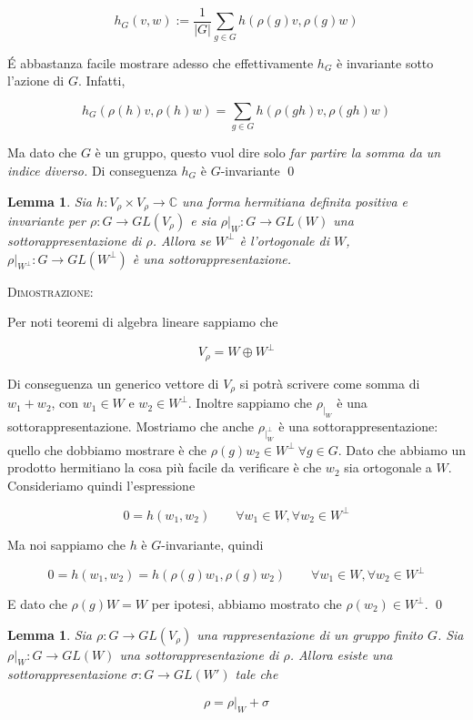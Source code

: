 \documentclass[11pt]{article}
\theoremstyle{plain}
\newtheorem{lemma}[thm]{Lemma}
\theoremstyle{definition}
\theoremstyle{remark}
\newcommand{\C}{\mathbb{C}}
\newcommand{\dsum}{\displaystyle\sum}
\begin{document}
\[h_G(v, w) := \dfrac{1}{|G|} \dsum_{g \in G} h(\rho(g)v,\rho(g) w) \]

\'E abbastanza facile mostrare adesso che effettivamente $h_G$ è invariante sotto l'azione di $G$. Infatti,

\[ h_G(\rho(h)v, \rho(h) w) = \dsum_{g \in G} h(\rho(gh)v , \rho(gh) w)\]

Ma dato che $G$ è un gruppo, questo vuol dire solo \emph{far partire la somma da un indice diverso.} Di conseguenza $h_G$ è $G$-invariante \qed


\begin{lemma}
Sia $h: V_\rho \times V_\rho \to \C$ una forma hermitiana definita positiva e invariante per $\rho: G \to GL(V_\rho)$ e sia $\rho|_W: G \to GL(W)$ una sottorappresentazione di $\rho$. Allora se $W^\perp$ è l'ortogonale di $W$, $\rho|_{W^\perp}: G \to GL(W^\perp)$ è una sottorappresentazione.

\end{lemma}

\textsc{Dimostrazione:}

Per noti teoremi di algebra lineare sappiamo che

\[ V_\rho = W \oplus W^\perp \]

Di conseguenza un generico vettore di $V_\rho$ si potrà scrivere come somma di $w_1 + w_2$, con $w_1 \in W$ e $w_2 \in W^\perp$. Inoltre sappiamo che $\rho_{|_W}$ è una sottorappresentazione. Mostriamo che anche $\rho_{|_W^\perp}$ è una sottorappresentazione: quello che dobbiamo mostrare è che $\rho(g) w_2 \in W^\perp \ \forall g \in G$. Dato che abbiamo un prodotto hermitiano la cosa più facile da verificare è che $w_2$ sia ortogonale a $W$. Consideriamo quindi l'espressione

\[ 0 = h(w_1, w_2) \qquad \forall w_1 \in W, \forall w_2 \in W^\perp\]

Ma noi sappiamo che $h$ è $G$-invariante, quindi

\[ 0 = h(w_1, w_2) = h(\rho(g) w_1, \rho(g) w_2) \qquad \forall w_1 \in W, \forall w_2 \in W^\perp \]

E dato che $\rho(g) W = W$ per ipotesi, abbiamo mostrato che $\rho(w_2) \in W^\perp$. \qed




\begin{lemma}
Sia $\rho: G \to GL(V_\rho)$ una rappresentazione di un gruppo finito $G$. Sia $\rho|_W: G \to GL(W)$ una sottorappresentazione di $\rho$. Allora esiste una sottorappresentazione $\sigma: G \to GL(W')$ tale che

\[\rho = \rho|_W + \sigma \]
\end{lemma}
\end{document}
